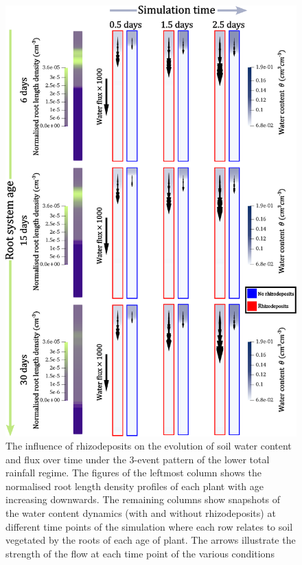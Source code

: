 \documentclass[11pt,a4paper]{article}
\numberwithin{equation}{section}
\begin{document}
\begin{figure}
	\centering
	\includegraphics[width = 0.75\linewidth, keepaspectratio]{almeria_3_events.eps}
	\caption{The influence of rhizodeposits on the evolution of soil water content and flux over time under the 3-event pattern of the lower total rainfall regime. The figures of the leftmost column shows the normalised root length density profiles of each plant with age increasing downwards. The remaining columns show snapshots of the water content dynamics (with and without rhizodeposits) at different time points of the simulation where each row relates to soil vegetated by the roots of each age of plant. The arrows illustrate the strength of the flow at each time point of the various conditions}
	\label{figure: almeria_3_events_fluxes}
\end{figure}
\end{document}

